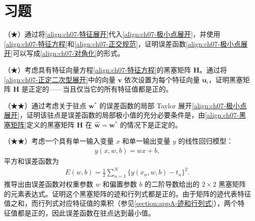 \documentclass[../../main.tex]{subfiles}
\begin{document}
\section{习题}\label{section:ch07-习题}

\begin{exercise}\label{exercise:ch07-01}
（★）通过将\eqref{align:ch07-特征展开}代入\eqref{align:ch07-极小点展开}，并使用\eqref{align:ch07-特征方程}和\eqref{align:ch07-正交规范}，证明误差函数\eqref{align:ch07-极小点展开}可以写成\eqref{align:ch07-对角化}的形式。
\end{exercise}

\begin{exercise}\label{exercise:ch07-02}
（★）考虑具有特征向量方程\eqref{align:ch07-特征方程}的黑塞矩阵 $\mathbf{H}$。通过将\eqref{align:ch07-正定二次型展开}中的向量 $\mathbf{v}$ 依次设置为每个特征向量 $\mathbf{u}_i$，证明黑塞矩阵 $\mathbf{H}$ 是正定的——当且仅当它的所有特征值都是正的。
\end{exercise}

\begin{exercise}\label{exercise:ch07-03}
（★★）通过考虑关于驻点 $\mathbf{w}^{\ast}$ 的误差函数的局部 Taylor 展开\eqref{align:ch07-极小点展开}，证明该驻点是误差函数的局部极小值的充分必要条件是，由\eqref{align:ch07-黑塞矩阵}定义的黑塞矩阵 $\mathbf{H}$ 在 $\hat{\mathbf{w}}=\mathbf{w}^{\ast}$ 的情况下是正定的。
\end{exercise}

\begin{exercise}\label{exercise:ch07-04}
（★★）考虑一个具有单一输入变量 $x$ 和单一输出变量 $y$ 的线性回归模型：
\begin{align}
y(x,w,b) = wx+b,
\label{align:ch07-习题线性模型}
\end{align}
平方和误差函数为
\begin{align}
E(w,b) = \frac{1}{2}\sum_{n=1}^{N}\bigl\{y(x_n,w,b)-t_n\bigr\}^{2}.
\label{align:ch07-习题平方和}
\end{align}
推导出由误差函数对权重参数 $w$ 和偏置参数 $b$ 的二阶导数给出的 $2\times2$ 黑塞矩阵的元素表达式。证明这个黑塞矩阵的迹和行列式都是正的。由于矩阵的迹代表特征值之和，而行列式对应特征值的乘积（参见\cref{section:appA-迹和行列式}），两个特征值都是正的，因此误差函数在驻点达到最小值。
\end{exercise}
\end{document}
